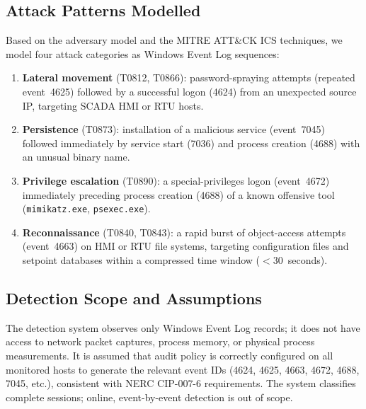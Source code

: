 \subsection{Attack Patterns Modelled}

Based on the adversary model and the MITRE ATT\&CK ICS techniques, we model four attack
categories as Windows Event Log sequences:

\begin{enumerate}
  \item \textbf{Lateral movement} (T0812, T0866): password-spraying attempts (repeated
        event~4625) followed by a successful logon (4624) from an unexpected source IP,
        targeting SCADA HMI or RTU hosts.

  \item \textbf{Persistence} (T0873): installation of a malicious service (event~7045)
        followed immediately by service start (7036) and process creation (4688) with an
        unusual binary name.

  \item \textbf{Privilege escalation} (T0890): a special-privileges logon (event~4672)
        immediately preceding process creation (4688) of a known offensive tool
        (\texttt{mimikatz.exe}, \texttt{psexec.exe}).

  \item \textbf{Reconnaissance} (T0840, T0843): a rapid burst of object-access attempts
        (event~4663) on HMI or RTU file systems, targeting configuration files and setpoint
        databases within a compressed time window ($<30$~seconds).
\end{enumerate}

\subsection{Detection Scope and Assumptions}

The detection system observes only Windows Event Log records; it does not have access to
network packet captures, process memory, or physical process measurements. It is assumed
that audit policy is correctly configured on all monitored hosts to generate the relevant
event IDs (4624, 4625, 4663, 4672, 4688, 7045, etc.), consistent with NERC CIP-007-6
requirements. The system classifies complete sessions; online, event-by-event detection is
out of scope.
